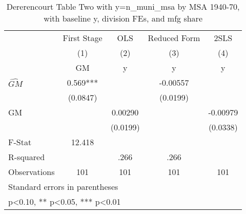 \begin{table}[htbp]\centering
\def\sym#1{\ifmmode^{#1}\else\(^{#1}\)\fi}
\caption{Dererencourt Table Two with y=n\_muni\_msa by MSA 1940-70, with baseline y, division FEs, and mfg share}
\begin{tabular}{l*{4}{c}}
\toprule
                    & First Stage   &         OLS   &Reduced Form   &        2SLS   \\
                    &\multicolumn{1}{c}{(1)}&\multicolumn{1}{c}{(2)}&\multicolumn{1}{c}{(3)}&\multicolumn{1}{c}{(4)}\\
                    &\multicolumn{1}{c}{GM}&\multicolumn{1}{c}{y}&\multicolumn{1}{c}{y}&\multicolumn{1}{c}{y}\\
\midrule
$\hat{GM}$          &       0.569***&               &    -0.00557   &               \\
                    &    (0.0847)   &               &    (0.0199)   &               \\
\addlinespace
GM                  &               &     0.00290   &               &    -0.00979   \\
                    &               &    (0.0199)   &               &    (0.0338)   \\
\midrule
F-Stat              &      12.418   &               &               &               \\
R-squared           &               &        .266   &        .266   &               \\
Observations        &         101   &         101   &         101   &         101   \\
\bottomrule
\multicolumn{5}{l}{\footnotesize Standard errors in parentheses}\\
\multicolumn{5}{l}{\footnotesize * p<0.10, ** p<0.05, *** p<0.01}\\
\end{tabular}
\end{table}

